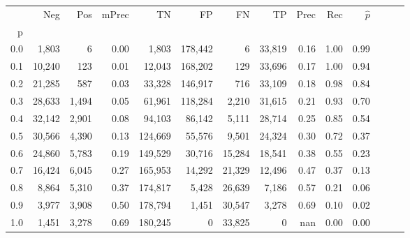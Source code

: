 \begin{tabular}{rrrrrrrrrrrrrr}
\toprule
{} &     Neg &    Pos & mPrec &       TN &       FP &      FN &      TP &  Prec &   Rec & $\hat{p}$ \\
p   &         &        &       &          &          &         &         &       &       &           \\
\midrule
0.0 &   1,803 &      6 &  0.00 &    1,803 &  178,442 &       6 &  33,819 &  0.16 &  1.00 &      0.99 \\
0.1 &  10,240 &    123 &  0.01 &   12,043 &  168,202 &     129 &  33,696 &  0.17 &  1.00 &      0.94 \\
0.2 &  21,285 &    587 &  0.03 &   33,328 &  146,917 &     716 &  33,109 &  0.18 &  0.98 &      0.84 \\
0.3 &  28,633 &  1,494 &  0.05 &   61,961 &  118,284 &   2,210 &  31,615 &  0.21 &  0.93 &      0.70 \\
0.4 &  32,142 &  2,901 &  0.08 &   94,103 &   86,142 &   5,111 &  28,714 &  0.25 &  0.85 &      0.54 \\
0.5 &  30,566 &  4,390 &  0.13 &  124,669 &   55,576 &   9,501 &  24,324 &  0.30 &  0.72 &      0.37 \\
0.6 &  24,860 &  5,783 &  0.19 &  149,529 &   30,716 &  15,284 &  18,541 &  0.38 &  0.55 &      0.23 \\
0.7 &  16,424 &  6,045 &  0.27 &  165,953 &   14,292 &  21,329 &  12,496 &  0.47 &  0.37 &      0.13 \\
0.8 &   8,864 &  5,310 &  0.37 &  174,817 &    5,428 &  26,639 &   7,186 &  0.57 &  0.21 &      0.06 \\
0.9 &   3,977 &  3,908 &  0.50 &  178,794 &    1,451 &  30,547 &   3,278 &  0.69 &  0.10 &      0.02 \\
1.0 &   1,451 &  3,278 &  0.69 &  180,245 &        0 &  33,825 &       0 &   nan &  0.00 &      0.00 \\
\bottomrule
\end{tabular}
